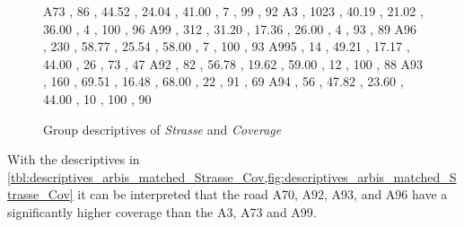 \begin{figure}[ht!]
\begin{minipage}{0.55\textwidth}
{			A73  , 86   , 44.52 , 24.04 , 41.00 , 7  , 99  , 92 
			A3   , 1023 , 40.19 , 21.02 , 36.00 , 4  , 100 , 96 
			A99  , 312  , 31.20 , 17.36 , 26.00 , 4  , 93  , 89 
			A96  , 230  , 58.77 , 25.54 , 58.00 , 7  , 100 , 93 
			A995 , 14   , 49.21 , 17.17 , 44.00 , 26 , 73  , 47 
			A92  , 82   , 56.78 , 19.62 , 59.00 , 12 , 100 , 88 
			A93  , 160  , 69.51 , 16.48 , 68.00 , 22 , 91  , 69 
			A94  , 56   , 47.82 , 23.60 , 44.00 , 10 , 100 , 90 
		}\data
		\pgfplotstablesort[sort key=mean, sort cmp=float >]{\datasorted}{\data}
		\tiny
		\centering
		\label{fig:descriptives_arbis_matched_Strasse_Cov}
	\end{minipage}%
	\caption{Group descriptives of \textit{Strasse} and \textit{Coverage}}
\end{figure}
With the descriptives in \cref{tbl:descriptives_arbis_matched_Strasse_Cov,fig:descriptives_arbis_matched_Strasse_Cov} it can be interpreted that the road A70, A92, A93, and A96 have a significantly higher coverage than the A3, A73 and A99.

